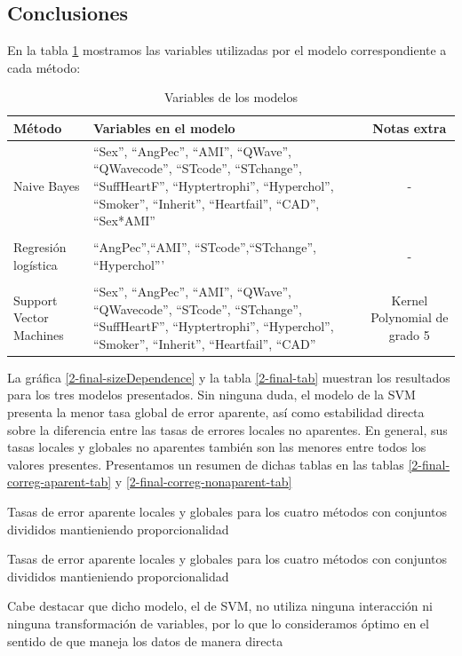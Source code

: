 \documentclass[11pt]{article}
\begin{document}
\subsection{Conclusiones}
En la tabla \ref{2-var} mostramos las variables utilizadas por el modelo correspondiente a cada método:
\begin{table}
    \centering
    \begin{tabular}{p{3cm}|p{5cm} | c}
        Método & Variables en el modelo & Notas extra\\
        \hline
        Naive Bayes & ``Sex'', ``AngPec'', ``AMI'', ``QWave'', ``QWavecode'', ``STcode'', ``STchange'', ``SuffHeartF'', ``Hyptertrophi'', ``Hyperchol'', ``Smoker'', ``Inherit'', ``Heartfail'', ``CAD'', ``Sex*AMI'' & -\\
        & & \\
        Regresión logística & ``AngPec'',``AMI'', ``STcode'',``STchange'', ``Hyperchol''' & - \\
        & & \\
        Support Vector Machines & ``Sex'', ``AngPec'', ``AMI'', ``QWave'', ``QWavecode'', ``STcode'', ``STchange'', ``SuffHeartF'', ``Hyptertrophi'', ``Hyperchol'', ``Smoker'', ``Inherit'', ``Heartfail'', ``CAD'' & Kernel Polynomial de grado 5 \\
    \end{tabular}
    \caption{Variables de los modelos}
    \label{2-var}
\end{table}
La gráfica \ref{2-final-sizeDependence} y la tabla \ref{2-final-tab} muestran los resultados para los tres modelos presentados. Sin ninguna duda, el modelo de la SVM presenta la menor tasa global de error aparente, así como estabilidad directa sobre la diferencia entre las tasas de errores locales no aparentes. En general, sus tasas locales y globales no aparentes también son las menores entre todos los valores presentes. Presentamos un resumen de dichas tablas en las tablas \ref{2-final-correg-aparent-tab} y \ref{2-final-correg-nonaparent-tab}

\begin{table}[H]
    \caption{Tasas de error aparente locales y globales para los cuatro métodos con conjuntos divididos mantieniendo proporcionalidad}
    \label{2-final-correg-aparent-tab}
\end{table}
\pagebreak

\begin{table}[H]
    \caption{Tasas de error aparente locales y globales para los cuatro métodos con conjuntos divididos mantieniendo proporcionalidad}
    \label{2-final-correg-nonaparent-tab}
\end{table}
Cabe destacar que dicho modelo, el de SVM, no utiliza ninguna interacción ni ninguna transformación de variables, por lo que lo consideramos óptimo en el sentido de que maneja los datos de manera directa
\end{document}
